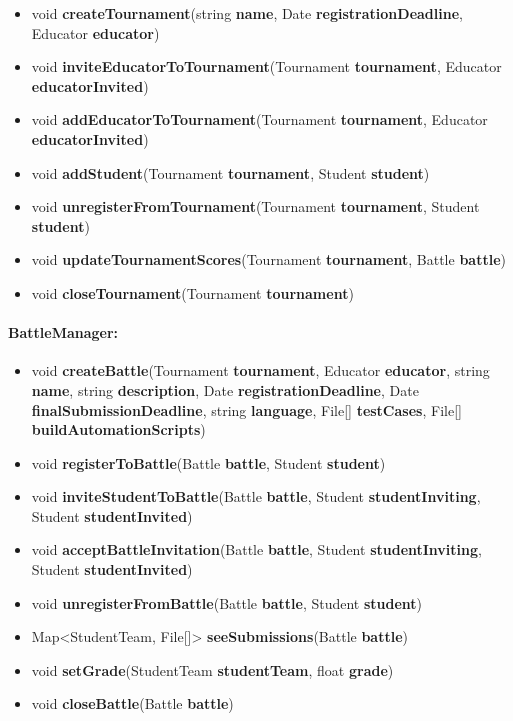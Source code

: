 \documentclass{article}
\begin{document}
\begin{itemize}
    \item void \textbf{createTournament}(string \textbf{name}, Date \textbf{registrationDeadline}, Educator \textbf{educator})
    \item void \textbf{inviteEducatorToTournament}(Tournament \textbf{tournament}, Educator \textbf{educatorInvited})
    \item void \textbf{addEducatorToTournament}(Tournament \textbf{tournament}, 
    Educator \textbf{educatorInvited})
    \item void \textbf{addStudent}(Tournament \textbf{tournament}, Student \textbf{student})
    \item void \textbf{unregisterFromTournament}(Tournament \textbf{tournament}, Student \textbf{student})
    \item void \textbf{updateTournamentScores}(Tournament \textbf{tournament}, Battle \textbf{battle})
    \item void \textbf{closeTournament}(Tournament \textbf{tournament})

\end{itemize}

\paragraph{BattleManager:}

\begin{itemize}
    \item void \textbf{createBattle}(Tournament \textbf{tournament}, Educator \textbf{educator}, string \textbf{name}, 
    string \textbf{description}, Date \textbf{registrationDeadline}, Date \textbf{finalSubmissionDeadline}, 
    string \textbf{language}, File[] \textbf{testCases}, File[] \textbf{buildAutomationScripts})
    \item void \textbf{registerToBattle}(Battle \textbf{battle}, Student \textbf{student})
    \item void \textbf{inviteStudentToBattle}(Battle \textbf{battle}, Student \textbf{studentInviting}, Student \textbf{studentInvited})
    \item void \textbf{acceptBattleInvitation}(Battle \textbf{battle}, Student \textbf{studentInviting}, Student \textbf{studentInvited})
    \item void \textbf{unregisterFromBattle}(Battle \textbf{battle}, Student \textbf{student})
    \item Map<StudentTeam, File[]> \textbf{seeSubmissions}(Battle \textbf{battle})
    \item void \textbf{setGrade}(StudentTeam \textbf{studentTeam}, float \textbf{grade})
    \item void \textbf{closeBattle}(Battle \textbf{battle})
\end{itemize}
\end{document}
